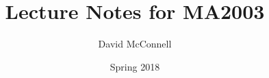 \documentclass[oneside, 11pt]{book}
\title{Lecture Notes for MA2003}
\author{David McConnell}
\date{Spring 2018}
\theoremstyle{definition}
\begin{document}
\makefrontmatter







\end{document}
